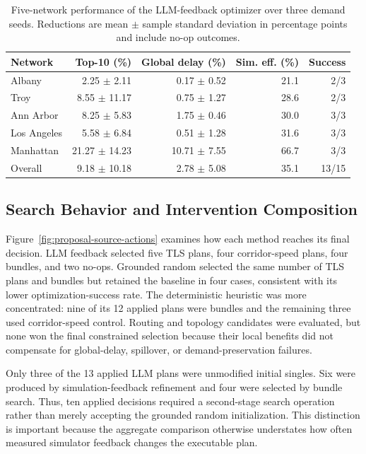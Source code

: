 \documentclass{trbunofficial}
\begin{document}
\begin{table}[!ht]
  \caption{Five-network performance of the LLM-feedback optimizer over three
  demand seeds. Reductions are mean $\pm$ sample standard deviation in
  percentage points and include no-op outcomes.}
  \label{tab:five-city-llm-results}
  \centering
  \small
  \setlength{\tabcolsep}{3pt}
  \begin{tabular}{lrrrr}
    \hline
    Network & Top-10 (\%) & Global delay (\%) & Sim. eff. (\%) & Success \\
    \hline
    Albany & 2.25 $\pm$ 2.11 & 0.17 $\pm$ 0.52 & 21.1 & 2/3 \\
    Troy & 8.55 $\pm$ 11.17 & 0.75 $\pm$ 1.27 & 28.6 & 2/3 \\
    Ann Arbor & 8.25 $\pm$ 5.83 & 1.75 $\pm$ 0.46 & 30.0 & 3/3 \\
    Los Angeles & 5.58 $\pm$ 6.84 & 0.51 $\pm$ 1.28 & 31.6 & 3/3 \\
    Manhattan & 21.27 $\pm$ 14.23 & 10.71 $\pm$ 7.55 & 66.7 & 3/3 \\
    \hline
    Overall & 9.18 $\pm$ 10.18 & 2.78 $\pm$ 5.08 & 35.1 & 13/15 \\
    \hline
  \end{tabular}
\end{table}

\subsection{Search Behavior and Intervention Composition}
\label{sec:search-behavior}

Figure~\ref{fig:proposal-source-actions} examines how each method reaches its
final decision.  LLM feedback selected five TLS plans, four corridor-speed
plans, four bundles, and two no-ops.  Grounded random selected the same number
of TLS plans and bundles but retained the baseline in four cases, consistent
with its lower optimization-success rate.  The deterministic heuristic was
more concentrated: nine of its 12 applied plans were bundles and the remaining
three used corridor-speed control.  Routing and topology candidates were
evaluated, but none won the final constrained selection because their local
benefits did not compensate for global-delay, spillover, or demand-preservation
failures.

Only three of the 13 applied LLM plans were unmodified initial singles.  Six
were produced by simulation-feedback refinement and four were selected by
bundle search.  Thus, ten applied decisions required a second-stage search
operation rather than merely accepting the grounded random initialization.
This distinction is important because the aggregate comparison otherwise
understates how often measured simulator feedback changes the executable plan.
\end{document}

